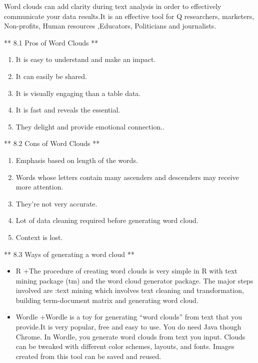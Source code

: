 \documentclass[]{book}
\providecommand{\tightlist}{%
  \setlength{\itemsep}{0pt}\setlength{\parskip}{0pt}}
\theoremstyle{definition}
\theoremstyle{definition}
\theoremstyle{definition}
\theoremstyle{remark}
\begin{document}
Word clouds can add clarity during text analysis in order to effectively
communicate your data results.It is an effective tool for Q researchers,
marketers, Non-profits, Human resources ,Educators, Politicians and
journalists.

** 8.1 Pros of Word Clouds **

\begin{enumerate}
\def\labelenumi{\arabic{enumi}.}
\tightlist
\item
  It is easy to understand and make an impact.
\item
  It can easily be shared.
\item
  It is visually engaging than a table data.
\item
  It is fast and reveals the essential.
\item
  They delight and provide emotional connection..
\end{enumerate}

** 8.2 Cons of Word Clouds **

\begin{enumerate}
\def\labelenumi{\arabic{enumi}.}
\tightlist
\item
  Emphasis based on length of the words.
\item
  Words whose letters contain many ascenders and descenders may receive
  more attention.
\item
  They're not very accurate.
\item
  Lot of data cleaning required before generating word cloud.
\item
  Context is lost.
\end{enumerate}

\citep{wordcloud}

** 8.3 Ways of generating a word cloud **

\begin{itemize}
\item
  R +The procedure of creating word clouds is very simple in R with text
  mining package (tm) and the word cloud generator package. The major
  steps involved are :text mining which involves text cleaning and
  transformation, building term-document matrix and generating word
  cloud. \citep{r}
\item
  Wordle +Wordle is a toy for generating ``word clouds'' from text that
  you provide.It is very popular, free and easy to use. You do need Java
  though Chrome. In Wordle, you generate word clouds from text you
  input. Clouds can be tweaked with different color schemes, layouts,
  and fonts. Images created from this tool can be saved and reused.
  \citep{wordle}
\end{itemize}
\end{document}
